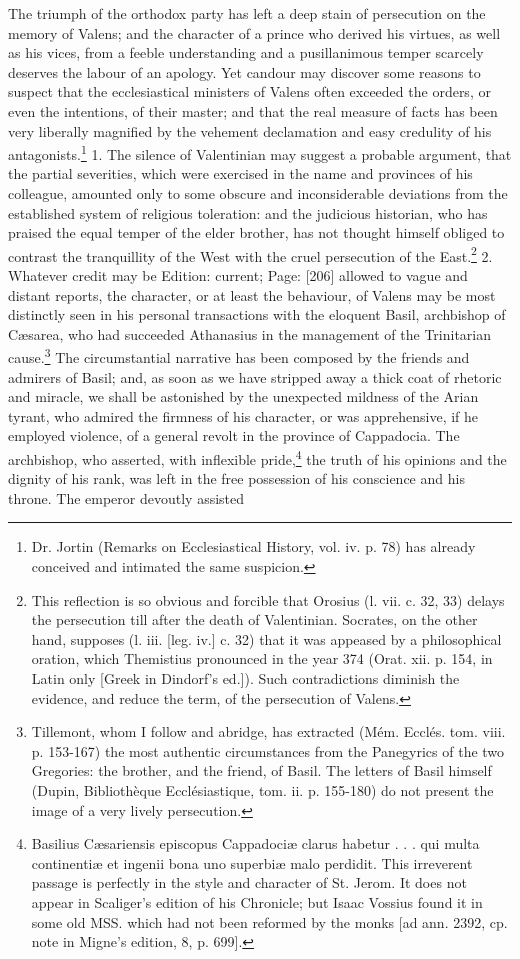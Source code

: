 The triumph of the orthodox party has left a deep stain of persecution on the memory of Valens; and the character of a prince who derived his virtues, as well as his vices, from a feeble understanding and a pusillanimous temper scarcely deserves the labour of an apology. Yet candour may discover some reasons to suspect that the ecclesiastical ministers of Valens often exceeded the orders, or even the intentions, of their master; and that the real measure of facts has been very liberally magnified by the vehement declamation and easy credulity of his antagonists.\footnote{Dr. Jortin (Remarks on Ecclesiastical History, vol. iv. p. 78) has already conceived and intimated the same suspicion.} 1. The silence of Valentinian may suggest a probable argument, that the partial severities, which were exercised in the name and provinces of his colleague, amounted only to some obscure and inconsiderable deviations from the established system of religious toleration: and the judicious historian, who has praised the equal temper of the elder brother, has not thought himself obliged to contrast the tranquillity of the West with the cruel persecution of the East.\footnote{This reflection is so obvious and forcible that Orosius (l. vii. c. 32, 33) delays the persecution till after the death of Valentinian. Socrates, on the other hand, supposes (l. iii. [leg. iv.] c. 32) that it was appeased by a philosophical oration, which Themistius pronounced in the year 374 (Orat. xii. p. 154, in Latin only [Greek in Dindorf\texthebrew{}’s ed.]). Such contradictions diminish the evidence, and reduce the term, of the persecution of Valens.} 2. Whatever credit may be Edition: current; Page: [206] allowed to vague and distant reports, the character, or at least the behaviour, of Valens may be most distinctly seen in his personal transactions with the eloquent Basil, archbishop of Cæsarea, who had succeeded Athanasius in the management of the Trinitarian cause.\footnote{Tillemont, whom I follow and abridge, has extracted (Mém. Ecclés. tom. viii. p. 153-167) the most authentic circumstances from the Panegyrics of the two Gregories: the brother, and the friend, of Basil. The letters of Basil himself (Dupin, Bibliothèque Ecclésiastique, tom. ii. p. 155-180) do not present the image of a very lively persecution.} The circumstantial narrative has been composed by the friends and admirers of Basil; and, as soon as we have stripped away a thick coat of rhetoric and miracle, we shall be astonished by the unexpected mildness of the Arian tyrant, who admired the firmness of his character, or was apprehensive, if he employed violence, of a general revolt in the province of Cappadocia. The archbishop, who asserted, with inflexible pride,\footnote{Basilius Cæsariensis episcopus Cappadociæ clarus habetur . . . qui multa continentiæ et ingenii bona uno superbiæ malo perdidit. This irreverent passage is perfectly in the style and character of St. Jerom. It does not appear in Scaliger\texthebrew{}’s edition of his Chronicle; but Isaac Vossius found it in some old MSS. which had not been reformed by the monks [ad ann. 2392, cp. note in Migne\texthebrew{}’s edition, 8, p. 699].} the truth of his opinions and the dignity of his rank, was left in the free possession of his conscience and his throne. The emperor devoutly assisted 